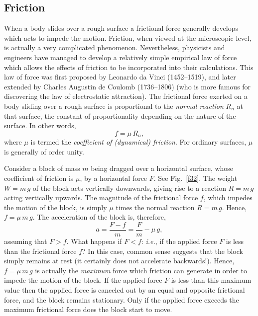 \subsection{Friction}
When a body slides over a rough surface a frictional force generally develops which
acts to impede the motion. Friction, when
viewed at the microscopic level, is actually a very complicated phenomenon.
Nevertheless, physicists and engineers have managed to develop
a relatively simple empirical law of force which allows the effects
of friction to be incorporated into their calculations. This law of force
was first proposed by Leonardo da Vinci (1452--1519), and later extended
by Charles Augustin de Coulomb (1736--1806) (who is more famous for discovering the
law of electrostatic attraction). The frictional
force exerted on a body sliding over a rough surface is proportional to
the {\em normal reaction} $R_n$ at that surface, the constant of proportionality
depending on the nature of the surface. In other words,
\begin{equation}
f = \mu\, R_n,
\end{equation}
where $\mu$ is termed the {\em coefficient of (dynamical) friction}. For ordinary
surfaces, 
$\mu$ is generally of order unity. 

Consider a block of mass $m$ being dragged over a horizontal
surface, whose coefficient of friction is $\mu$, by a horizontal
force $F$. See Fig.~\ref{f32}. The weight $W=m\,g$ of the block
acts vertically downwards, giving rise to a reaction $R=m\,g$ acting
vertically upwards. The magnitude of the frictional force $f$, which
impedes the motion of the block, is simply $\mu$ times the
normal reaction $R=m\,g$. Hence, $f=\mu\,m\,g$. The acceleration of
the block is, therefore,
\begin{equation}
a = \frac{F - f}{m} = \frac{F}{m}-\mu\,g,
\end{equation}
assuming that $F>f$. What happens if $F<f$: {\em i.e.}, if the applied
force $F$ is less than the frictional force $f$? In this case, common
sense suggests that the block
simply remains at rest (it certainly does not
accelerate backwards!). Hence, $f=\mu\,m\,g$ is actually the {\em maximum}
force which friction can generate in order to impede the motion of the
block. If the applied force $F$ is less than this maximum value then the 
applied force is canceled out by an equal and opposite frictional force, and
the block remains stationary. Only if the applied force exceeds the
maximum frictional force does the block start to move.

